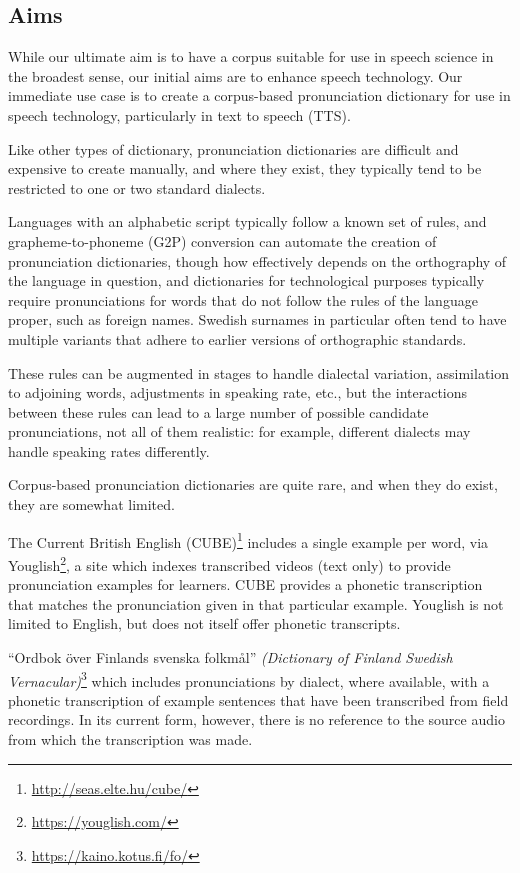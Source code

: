 \documentclass{Interspeech}
\begin{document}
\subsection{Aims}

While our ultimate aim is to have a corpus suitable for use in speech science in the broadest sense, our initial aims are to enhance speech technology. Our immediate use case is to create a corpus-based pronunciation dictionary for use in speech technology, particularly in text to speech (TTS).

Like other types of dictionary, pronunciation dictionaries are difficult and expensive to create manually, and where they exist, they typically tend to be restricted to one or two standard dialects.

Languages with an alphabetic script typically follow a known set of rules, and grapheme-to-phoneme (G2P) conversion can automate the creation of pronunciation dictionaries, though how effectively depends on the orthography of the language in question, and dictionaries for technological purposes typically require pronunciations for words that do not follow the rules of the language proper, such as foreign names. Swedish surnames in particular often tend to have multiple variants that adhere to earlier versions of orthographic standards.\cite{gustafson1996swedish}

These rules can be augmented in stages to handle dialectal variation, assimilation to adjoining words, adjustments in speaking rate, etc., but the interactions between these rules can lead to a large number of possible candidate pronunciations, not all of them realistic: for example, different dialects may handle speaking rates differently.

Corpus-based pronunciation dictionaries are quite rare, and when they do exist, they are somewhat limited.

The Current British English (CUBE)\footnote{\href{http://seas.elte.hu/cube/}{http://seas.elte.hu/cube/}} includes a single example per word, via Youglish\footnote{\href{https://youglish.com/}{https://youglish.com/}}, a site which indexes transcribed videos (text only) to provide pronunciation examples for learners. CUBE provides a phonetic transcription that matches the pronunciation given in that particular example. Youglish is not limited to English, but does not itself offer phonetic transcripts.

``Ordbok över Finlands svenska folkmål'' \textit{(Dictionary of Finland Swedish Vernacular)}\footnote{\href{https://kaino.kotus.fi/fo/}{https://kaino.kotus.fi/fo/}} which includes pronunciations by dialect, where available, with a phonetic transcription of example sentences that have been transcribed from field recordings. In its current form, however, there is no reference to the source audio from which the transcription was made.
\end{document}
